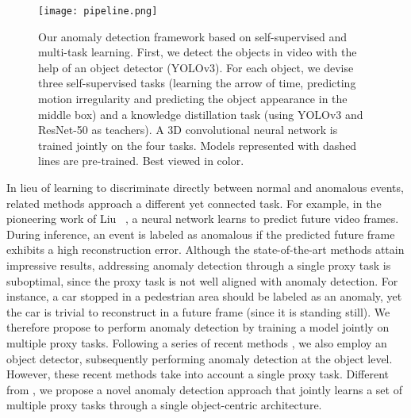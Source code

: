 \documentclass[final]{cvpr}
\begin{document}
\begin{figure*}[!th]
\begin{center}
\texttt{[image: pipeline.png]}
\end{center}
\vspace{-0.35cm}
\caption{Our anomaly detection framework based on self-supervised and multi-task learning. First, we detect the objects in video with the help of an object detector (YOLOv3). For each object, we devise three self-supervised tasks (learning the arrow of time, predicting motion irregularity and predicting the object appearance in the middle box) and a knowledge distillation task (using YOLOv3 and ResNet-50 as teachers). A 3D convolutional neural network is trained jointly on the four tasks. Models represented with dashed lines are pre-trained. Best viewed in color.}
\label{fig:pipeline}
\vspace{-0.3cm}
\end{figure*}

In lieu of learning to discriminate directly between normal and anomalous events, related methods approach a different yet connected task. For example, in the pioneering work of Liu \etal~\cite{Liu-CVPR-2018}, a neural network learns to predict future video frames. During inference, an event is labeled as anomalous if the predicted future frame exhibits a high reconstruction error. Although the state-of-the-art methods attain impressive results, addressing anomaly detection through a single proxy task is suboptimal, since the proxy task is not well aligned with anomaly detection. For instance, a car stopped in a pedestrian area should be labeled as an anomaly, yet the car is trivial to reconstruct in a future frame (since it is standing still). We therefore propose to perform anomaly detection by training a model jointly on multiple proxy tasks. Following a series of recent methods \cite{Doshi-CVPRW-2020a,Doshi-CVPRW-2020b,Ionescu-CVPR-2019,Yu-ACMMM-2020}, we also employ an object detector, subsequently performing anomaly detection at the object level. However, these recent methods take into account a single proxy task. Different from \cite{Doshi-CVPRW-2020a,Doshi-CVPRW-2020b,Ionescu-CVPR-2019,Yu-ACMMM-2020}, we propose a novel anomaly detection approach that jointly learns a set of multiple proxy tasks through a single object-centric architecture.  
\end{document}
